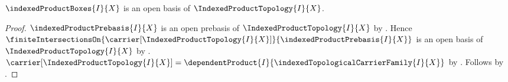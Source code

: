 \begin{theorem}\label{indexed_product_boxes_form_open_basis}
    $\indexedProductBoxes{I}{X}$ is an open basis of
        $\IndexedProductTopology{I}{X}$.
\end{theorem}
\begin{proof}
    $\indexedProductPrebasis{I}{X}$ is an open prebasis of
        $\IndexedProductTopology{I}{X}$ by
        .
    Hence
        $\finiteIntersectionsOn{
            \carrier[\IndexedProductTopology{I}{X}]}{
            \indexedProductPrebasis{I}{X}}$
        is an open basis of $\IndexedProductTopology{I}{X}$ by
        .
    $\carrier[\IndexedProductTopology{I}{X}]
        =\dependentProduct{I}{
            \indexedTopologicalCarrierFamily{I}{X}}$ by
        .
    Follows by .
\end{proof}
